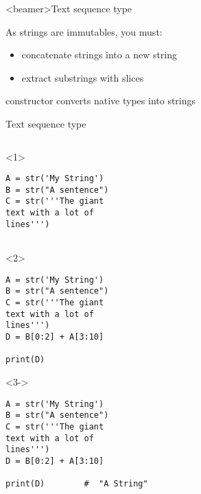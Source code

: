 \begin{frame}<beamer>{Text sequence type}

   As strings are immutables, you must:

  \medskip

  \begin{itemize}
    \item<2-> concatenate strings into a new string
    \item<3-> extract substrings with slices
  \end{itemize}

  \bigskip

    constructor converts native types into strings

\end{frame}


\begin{frame}[fragile]{Text sequence type}

  \begin{columns}[onlytextwidth]
    \begin{column}{\textwidth}
      \begin{onlyenv}<1>
        \begin{lstlisting}[style=python]
A = str('My String')
B = str("A sentence")
C = str('''The giant
text with a lot of
lines''')


 \end{lstlisting}
      \end{onlyenv}

      \begin{onlyenv}<2>
        \begin{lstlisting}[style=python]
A = str('My String')
B = str("A sentence")
C = str('''The giant
text with a lot of
lines''')
D = B[0:2] + A[3:10]

print(D) \end{lstlisting}
      \end{onlyenv}


      \begin{onlyenv}<3->
        \begin{lstlisting}[style=python]
A = str('My String')
B = str("A sentence")
C = str('''The giant
text with a lot of
lines''')
D = B[0:2] + A[3:10]

print(D)        #  "A String" \end{lstlisting}
      \end{onlyenv}
    \end{column}
  \end{columns}

\end{frame}


